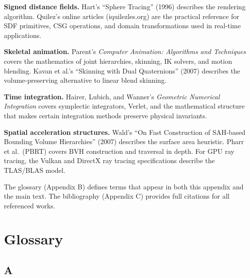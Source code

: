 \documentclass[
  11pt,
  letterpaper,
  DIV=11,
  numbers=noendperiod,
  twoside,
  open=right]{scrreprt}
\begin{document}
\textbf{Signed distance fields.} Hart's ``Sphere Tracing'' (1996)
describes the rendering algorithm. Quilez's online articles
(iquilezles.org) are the practical reference for SDF primitives, CSG
operations, and domain transformations used in real-time applications.

\textbf{Skeletal animation.} Parent's \emph{Computer Animation:
Algorithms and Techniques} covers the mathematics of joint hierarchies,
skinning, IK solvers, and motion blending. Kavan et al.'s ``Skinning
with Dual Quaternions'' (2007) describes the volume-preserving
alternative to linear blend skinning.

\textbf{Time integration.} Hairer, Lubich, and Wanner's \emph{Geometric
Numerical Integration} covers symplectic integrators, Verlet, and the
mathematical structure that makes certain integration methods preserve
physical invariants.

\textbf{Spatial acceleration structures.} Wald's ``On Fast Construction
of SAH-based Bounding Volume Hierarchies'' (2007) describes the surface
area heuristic. Pharr et al.~(PBRT) covers BVH construction and
traversal in depth. For GPU ray tracing, the Vulkan and DirectX ray
tracing specifications describe the TLAS/BLAS model.

The glossary (Appendix B) defines terms that appear in both this
appendix and the main text. The bibliography (Appendix C) provides full
citations for all referenced works.

\chapter{Glossary}\label{glossary}

\section*{A}\label{a}

\end{document}
